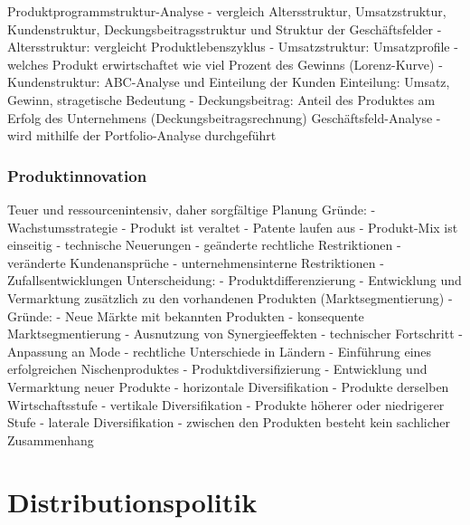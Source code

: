 Produktprogrammstruktur-Analyse
	- vergleich Altersstruktur, Umsatzstruktur, Kundenstruktur,
	 Deckungsbeitragsstruktur und Struktur der Geschäftsfelder
		- Altersstruktur: vergleicht Produktlebenszyklus
		- Umsatzstruktur: Umsatzprofile - welches Produkt
		 erwirtschaftet wie viel Prozent des Gewinns (Lorenz-Kurve)
		- Kundenstruktur: ABC-Analyse und Einteilung der Kunden
		 Einteilung: Umsatz, Gewinn, stragetische Bedeutung
		- Deckungsbeitrag: Anteil des Produktes am Erfolg des
		 Unternehmens (Deckungsbeitragsrechnung)
Geschäftsfeld-Analyse
	- wird mithilfe der Portfolio-Analyse durchgeführt 

\subsubsection{Produktinnovation}

Teuer und ressourcenintensiv, daher sorgfältige Planung
Gründe:
	- Wachstumsstrategie
	- Produkt ist veraltet
	- Patente laufen aus
	- Produkt-Mix ist einseitig
	- technische Neuerungen
	- geänderte rechtliche Restriktionen
	- veränderte Kundenansprüche
	- unternehmensinterne Restriktionen
	- Zufallsentwicklungen
Unterscheidung:
	- Produktdifferenzierung
		- Entwicklung und Vermarktung zusätzlich zu den vorhandenen
		 Produkten (Marktsegmentierung)
		- Gründe:
			- Neue Märkte mit bekannten Produkten
			- konsequente Marktsegmentierung
			- Ausnutzung von Synergieeffekten
			- technischer Fortschritt
			- Anpassung an Mode
			- rechtliche Unterschiede in Ländern
			- Einführung eines erfolgreichen Nischenproduktes
	- Produktdiversifizierung
		- Entwicklung und Vermarktung neuer Produkte
		- horizontale Diversifikation
			- Produkte derselben Wirtschaftsstufe
		- vertikale Diversifikation
			- Produkte höherer oder niedrigerer Stufe
		- laterale Diversifikation
			- zwischen den Produkten besteht kein sachlicher
			 Zusammenhang

			 
			 
\section{Distributionspolitik}
